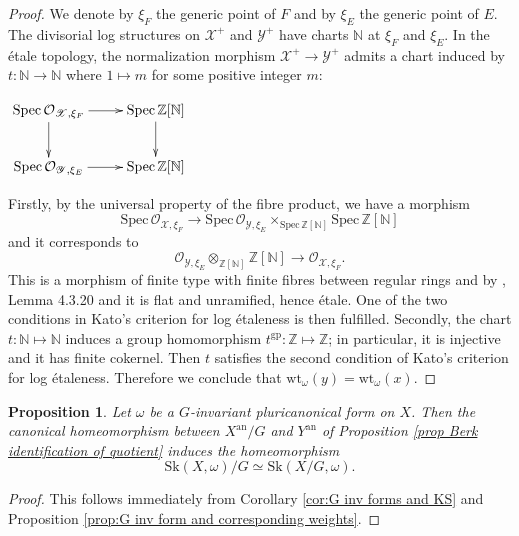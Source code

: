 \documentclass{amsart}%
\numberwithin{equation}{subsection}
\theoremstyle{plain2}
\newtheorem{prop}[equation]{Proposition}
\theoremstyle{definition2}
\theoremstyle{stepstyle}
\theoremstyle{point}
\theoremstyle{subpoint}
\newcommand{\N}{\ensuremath{\mathbb{N}}}
\newcommand{\Z}{\ensuremath{\mathbb{Z}}}
\newcommand{\cX}{\ensuremath{\mathscr{X}}}
\newcommand{\caO}{\ensuremath{\mathcal{O}}}
\newcommand{\cY}{\ensuremath{\mathscr{Y}}}
\renewcommand{\cY}{\ensuremath{\mathscr{Y}}}
\newcommand{\Spec}{\ensuremath{\mathrm{Spec}\,}}
\newcommand{\an}{\mathrm{an}}
\newcommand{\weight}{\mathrm{wt}}
\newcommand{\Sk}{\mathrm{Sk}}
\begin{document}
\begin{proof}
We denote by $\xi_{F}$ the generic point of $F$ and by $\xi_E$ the generic point of $E$. The divisorial log structures on $\cX^+$ and $\cY^+$ have charts $\N$ at $\xi_{F}$ and $\xi_E$. In the \'{e}tale topology, the normalization morphism $\cX^+ \rightarrow \cY^+$ admits a chart induced by $t:\N \rightarrow \N$ where $1 \mapsto m$ for some positive integer $m$:
\begin{center}
$\xymatrix{
\Spec \caO_{\cX, \xi_{F}} \ar[d] \ar[r] & \Spec \Z[\N] \ar[d] \\
\Spec \caO_{\cY, \xi_{E}}  \ar[r] & \Spec \Z[\N] 
}$
\end{center} Firstly, by the universal property of the fibre product, we have a morphism $$\Spec \caO_{\cX, \xi_{F}} \rightarrow \Spec \caO_{\cY, \xi_{E}} \times_{\Spec \Z[\N] } \Spec \Z[\N]$$ and it corresponds to $$ \caO_{\cY, \xi_{E}}  \otimes_{\Z[\N]} \Z[\N] \rightarrow\caO_{\cX, \xi_{F}}.$$ This is a morphism of finite type with finite fibres between regular rings and by \cite{Liu2002}, Lemma 4.3.20 and \cite{Nowak} it is flat and unramified, hence \'{e}tale. One of the two conditions in Kato's criterion for log \'{e}taleness is then fulfilled. Secondly, the chart $t:\N \mapsto \N$ induces a group homomorphism $t^{\text{gp}}: \Z \mapsto \Z$; in particular, it is injective and it has finite cokernel. Then $t$ satisfies the second condition of Kato's criterion for log \'{e}taleness. Therefore we conclude that $\weight_\omega(y)=\weight_\omega(x)$.
\end{proof}

\begin{prop} \label{prop:G inv and homeo KS of quotient}
Let $\omega$ be a $G$-invariant pluricanonical form on $X$. Then the canonical homeomorphism between $X^\an/G$ and $Y^\an$ of Proposition \ref{prop Berk identification of quotient} induces the homeomorphism $$\Sk(X,\omega)/G \simeq \Sk(X/G,\omega).$$
\end{prop}
\begin{proof}
This follows immediately from Corollary \ref{cor:G inv forms and KS} and Proposition \ref{prop:G inv form and corresponding weights}.
\end{proof}
\end{document}
